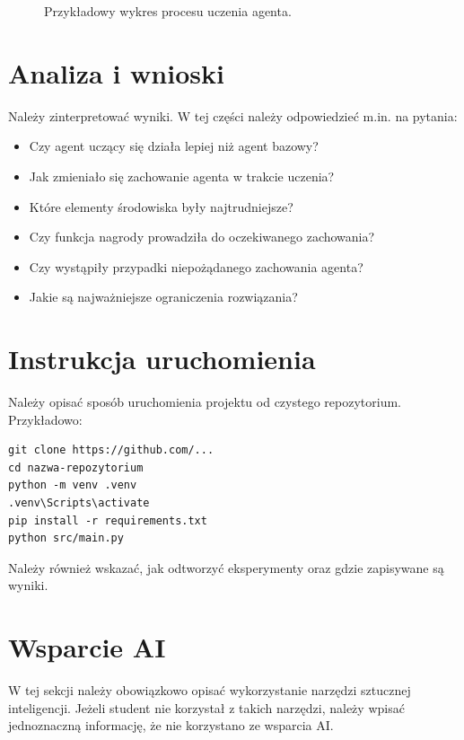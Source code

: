 \documentclass[12pt]{article}
\begin{document}
\begin{figure}[h]
    \centering
    \caption{Przykładowy wykres procesu uczenia agenta.}
\end{figure}

\section{Analiza i wnioski}

Należy zinterpretować wyniki. W tej części należy odpowiedzieć m.in. na pytania:
\begin{itemize}
    \item Czy agent uczący się działa lepiej niż agent bazowy?
    \item Jak zmieniało się zachowanie agenta w trakcie uczenia?
    \item Które elementy środowiska były najtrudniejsze?
    \item Czy funkcja nagrody prowadziła do oczekiwanego zachowania?
    \item Czy wystąpiły przypadki niepożądanego zachowania agenta?
    \item Jakie są najważniejsze ograniczenia rozwiązania?
\end{itemize}

\section{Instrukcja uruchomienia}

Należy opisać sposób uruchomienia projektu od czystego repozytorium. Przykładowo:

\begin{verbatim}
git clone https://github.com/...
cd nazwa-repozytorium
python -m venv .venv
.venv\Scripts\activate
pip install -r requirements.txt
python src/main.py
\end{verbatim}

Należy również wskazać, jak odtworzyć eksperymenty oraz gdzie zapisywane są wyniki.

\section{Wsparcie AI}

W tej sekcji należy obowiązkowo opisać wykorzystanie narzędzi sztucznej inteligencji. Jeżeli student nie korzystał z takich narzędzi, należy wpisać jednoznaczną informację, że nie korzystano ze wsparcia AI.
\end{document}
